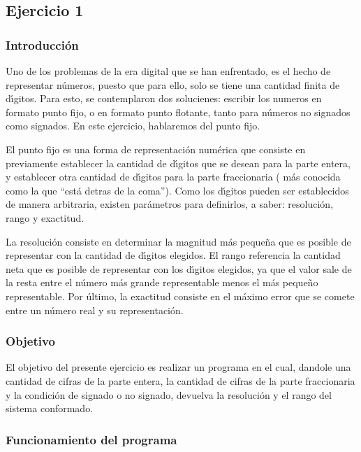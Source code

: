 \documentclass[english]{article}
\begin{document}
\subsection{Ejercicio 1}

\subsubsection{Introducci\'{o}n}

Uno de los problemas de la era digital que se han enfrentado, es el
hecho de representar n\'{u}meros, puesto que para ello, solo se tiene
una cantidad finita de d\'{\i}gitos. Para esto, se contemplaron dos
solucienes: escribir los numeros en formato punto fijo, o en formato
punto flotante, tanto para n\'{u}meros no signados como signados.
En este ejercicio, hablaremos del punto fijo.

El punto fijo es una forma de representaci\'{o}n num\'{e}rica que
consiste en previamente establecer la cantidad de d\'{\i}gitos que
se desean para la parte entera, y establecer otra cantidad de d\'{\i}gitos
para la parte fraccionaria ( m\'{a}s conocida como la que ``est\'{a}
detras de la coma''). Como los d\'{\i}gitos pueden ser establecidos
de manera arbitraria, existen par\'{a}metros para definirlos, a saber:
resoluci\'{o}n, rango y exactitud. 

La resoluci\'{o}n consiste en determinar la magnitud m\'{a}s peque\~{n}a
que es posible de representar con la cantidad de d\'{\i}gitos elegidos.
El rango referencia la cantidad neta que es posible de representar
con los d\'{\i}gitos elegidos, ya que el valor sale de la resta entre
el n\'{u}mero m\'{a}s grande representable menos el m\'{a}s peque\~{n}o
representable. Por \'{u}ltimo, la exactitud consiste en el m\'{a}ximo
error que se comete entre un n\'{u}mero real y su representaci\'{o}n.

\subsubsection{Objetivo}

El objetivo del presente ejercicio es realizar un programa en el cual,
dandole una cantidad de cifras de la parte entera, la cantidad de
cifras de la parte fraccionaria y la condici\'{o}n de signado o no
signado, devuelva la resoluci\'{o}n y el rango del sistema conformado.

\subsubsection{Funcionamiento del programa}
\end{document}
